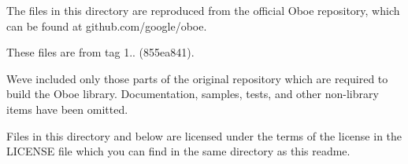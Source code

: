The files in this directory are reproduced from the official Oboe repository, which can be found at github.\+com/google/oboe.

These files are from tag 1.. (855ea841).

We\textquotesingle{}ve included only those parts of the original repository which are required to build the Oboe library. Documentation, samples, tests, and other non-\/library items have been omitted.

Files in this directory and below are licensed under the terms of the license in the LICENSE file which you can find in the same directory as this readme. 